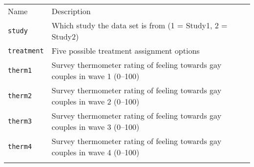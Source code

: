 \documentclass[]{article}
\begin{document}
\begin{longtable}[c]{@{}ll@{}}
\toprule\addlinespace
\begin{minipage}[b]{0.25\columnwidth}\raggedright
Name
\end{minipage} & \begin{minipage}[b]{0.68\columnwidth}\raggedright
Description
\end{minipage}
\\\addlinespace
\midrule\endhead
\begin{minipage}[t]{0.25\columnwidth}\raggedright
\texttt{study}
\end{minipage} & \begin{minipage}[t]{0.68\columnwidth}\raggedright
Which study the data set is from (1 = Study1, 2 = Study2)
\end{minipage}
\\\addlinespace
\begin{minipage}[t]{0.25\columnwidth}\raggedright
\texttt{treatment}
\end{minipage} & \begin{minipage}[t]{0.68\columnwidth}\raggedright
Five possible treatment assignment options
\end{minipage}
\\\addlinespace
\begin{minipage}[t]{0.25\columnwidth}\raggedright
\texttt{therm1}
\end{minipage} & \begin{minipage}[t]{0.68\columnwidth}\raggedright
Survey thermometer rating of feeling towards gay couples in wave 1
(0--100)
\end{minipage}
\\\addlinespace
\begin{minipage}[t]{0.25\columnwidth}\raggedright
\texttt{therm2}
\end{minipage} & \begin{minipage}[t]{0.68\columnwidth}\raggedright
Survey thermometer rating of feeling towards gay couples in wave 2
(0--100)
\end{minipage}
\\\addlinespace
\begin{minipage}[t]{0.25\columnwidth}\raggedright
\texttt{therm3}
\end{minipage} & \begin{minipage}[t]{0.68\columnwidth}\raggedright
Survey thermometer rating of feeling towards gay couples in wave 3
(0--100)
\end{minipage}
\\\addlinespace
\begin{minipage}[t]{0.25\columnwidth}\raggedright
\texttt{therm4}
\end{minipage} & \begin{minipage}[t]{0.68\columnwidth}\raggedright
Survey thermometer rating of feeling towards gay couples in wave 4
(0--100)
\end{minipage}
\\\addlinespace
\bottomrule
\end{longtable}
\end{document}
